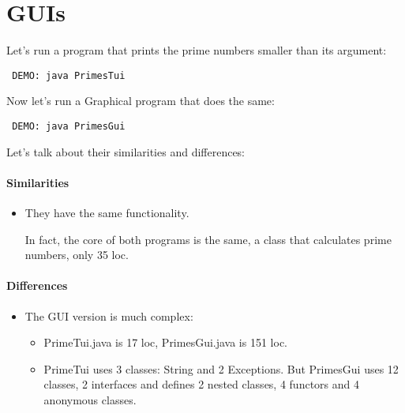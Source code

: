 \documentclass[a4paper, 9pt]{extarticle}
\begin{document}
\section{GUIs}

Let's run a program that prints the prime numbers smaller than its argument:

\verb+ DEMO: java PrimesTui+

Now let's run a Graphical program that does the same:

\verb+ DEMO: java PrimesGui+

Let's talk about their similarities and differences:

\paragraph{Similarities}

\begin{itemize}

  \item They have the same functionality.

    In fact, the core of both programs is the same, a class that calculates
    prime numbers, only 35 loc.

\end{itemize}

\paragraph{Differences}

\begin{itemize}

  \item The GUI version is much complex:

    \begin{itemize}

      \item PrimeTui.java is 17 loc, PrimesGui.java is 151 loc.

      \item PrimeTui uses 3 classes: String and 2 Exceptions. But PrimesGui
        uses 12 classes, 2 interfaces and defines 2 nested classes, 4 functors
        and 4 anonymous classes.

    \end{itemize}

\end{itemize}
\end{document}
